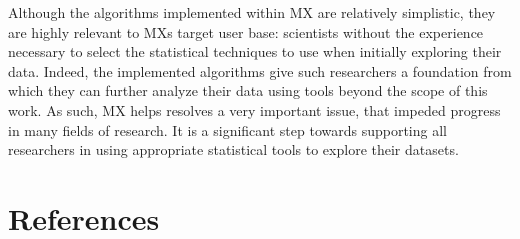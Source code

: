 \documentclass{article}
\begin{document}
Although the algorithms implemented within MX are relatively simplistic, they are highly relevant to MXs target user base: scientists without the experience necessary to select the statistical techniques to use when initially exploring their data. Indeed, the implemented algorithms give such researchers a foundation from which they can further analyze their data using tools beyond the scope of this work. As such, MX helps resolves a very important issue, that impeded progress in many fields of research. It is a significant step towards supporting all researchers in using appropriate statistical tools to explore their datasets.



\section*{References}
\medskip
\small




\end{document}
